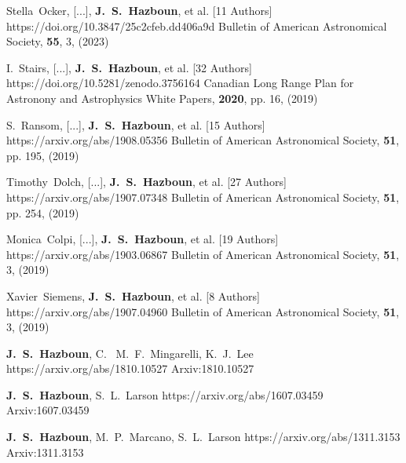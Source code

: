          {Stella~{Ocker}, [...], \textbf{J.~S.~{Hazboun}}, et al. [11 Authors]}
         {https://doi.org/10.3847/25c2cfeb.dd406a9d}
         {{Bulletin of American Astronomical Society}, \textbf{55}, 3, (2023)}

         {I.~{Stairs}, [...], \textbf{J.~S.~{Hazboun}}, et al. [32 Authors]}
         {https://doi.org/10.5281/zenodo.3756164}
         {{Canadian Long Range Plan for Astronony and Astrophysics White Papers}, \textbf{2020}, pp. 16, (2019)}

         {S.~{Ransom}, [...], \textbf{J.~S.~{Hazboun}}, et al. [15 Authors]}
         {https://arxiv.org/abs/1908.05356}
         {{Bulletin of American Astronomical Society}, \textbf{51}, pp. 195, (2019)}

         {Timothy~{Dolch}, [...], \textbf{J.~S.~{Hazboun}}, et al. [27 Authors]}
         {https://arxiv.org/abs/1907.07348}
         {{Bulletin of American Astronomical Society}, \textbf{51}, pp. 254, (2019)}

         {Monica~{Colpi}, [...], \textbf{J.~S.~{Hazboun}}, et al. [19 Authors]}
         {https://arxiv.org/abs/1903.06867}
         {{Bulletin of American Astronomical Society}, \textbf{51}, 3, (2019)}

         {Xavier~{Siemens}, \textbf{J.~S.~{Hazboun}}, et al. [8 Authors]}
         {https://arxiv.org/abs/1907.04960}
         {{Bulletin of American Astronomical Society}, \textbf{51}, 3, (2019)}

         {\textbf{J.~S.~Hazboun}, C.~ M.~F.~{Mingarelli}, K.~J.~{Lee}}
         {https://arxiv.org/abs/1810.10527}
         {{Arxiv:}1810.10527}

         {\textbf{J.~S.~Hazboun}, S.~L.~{Larson}}
         {https://arxiv.org/abs/1607.03459}
         {{Arxiv:}1607.03459}

         {\textbf{J.~S.~Hazboun}, M.~P.~{Marcano}, S.~L.~{Larson}}
         {https://arxiv.org/abs/1311.3153}
         {{Arxiv:}1311.3153}

